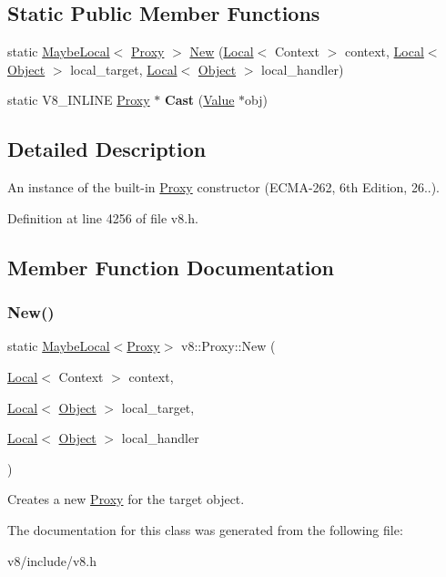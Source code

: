\subsection*{Static Public Member Functions}
\begin{DoxyCompactItemize}
\item 
static \mbox{\hyperlink{classv8_1_1MaybeLocal}{Maybe\+Local}}$<$ \mbox{\hyperlink{classv8_1_1Proxy}{Proxy}} $>$ \mbox{\hyperlink{classv8_1_1Proxy_ab58d9d98f17d299ca7a487d05e771260}{New}} (\mbox{\hyperlink{classv8_1_1Local}{Local}}$<$ Context $>$ context, \mbox{\hyperlink{classv8_1_1Local}{Local}}$<$ \mbox{\hyperlink{classv8_1_1Object}{Object}} $>$ local\+\_\+target, \mbox{\hyperlink{classv8_1_1Local}{Local}}$<$ \mbox{\hyperlink{classv8_1_1Object}{Object}} $>$ local\+\_\+handler)
\item 
\mbox{\label{classv8_1_1Proxy_a6562478fdedab6fa0fe20ede066b2a78}} 
static V8\+\_\+\+I\+N\+L\+I\+NE \mbox{\hyperlink{classv8_1_1Proxy}{Proxy}} $\ast$ {\bfseries Cast} (\mbox{\hyperlink{classv8_1_1Value}{Value}} $\ast$obj)
\end{DoxyCompactItemize}


\subsection{Detailed Description}
An instance of the built-\/in \mbox{\hyperlink{classv8_1_1Proxy}{Proxy}} constructor (E\+C\+M\+A-\/262, 6th Edition, 26..). 

Definition at line 4256 of file v8.\+h.



\subsection{Member Function Documentation}
\mbox{\label{classv8_1_1Proxy_ab58d9d98f17d299ca7a487d05e771260}} 
\subsubsection{\texorpdfstring{New()}{New()}}
{\footnotesize\ttfamily static \mbox{\hyperlink{classv8_1_1MaybeLocal}{Maybe\+Local}}$<$\mbox{\hyperlink{classv8_1_1Proxy}{Proxy}}$>$ v8\+::\+Proxy\+::\+New (\begin{DoxyParamCaption}\item[{\mbox{\hyperlink{classv8_1_1Local}{Local}}$<$ Context $>$}]{context,  }\item[{\mbox{\hyperlink{classv8_1_1Local}{Local}}$<$ \mbox{\hyperlink{classv8_1_1Object}{Object}} $>$}]{local\+\_\+target,  }\item[{\mbox{\hyperlink{classv8_1_1Local}{Local}}$<$ \mbox{\hyperlink{classv8_1_1Object}{Object}} $>$}]{local\+\_\+handler }\end{DoxyParamCaption})\hspace{0.3cm}{\ttfamily [static]}}

Creates a new \mbox{\hyperlink{classv8_1_1Proxy}{Proxy}} for the target object. 

The documentation for this class was generated from the following file\+:\begin{DoxyCompactItemize}
\item 
v8/include/v8.\+h\end{DoxyCompactItemize}
